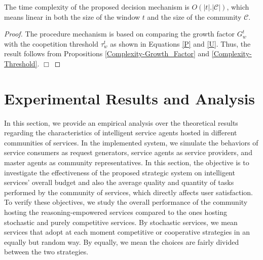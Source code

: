 \begin{theorem}\label{Complexity-Procedure}
The time complexity of the proposed decision mechanism is
$O(|t|.|\mathcal{C}|)$, which means linear in both the size of the
window $t$ and the size of the community $\mathcal{C}$.
\end{theorem}

\begin{proof}
The procedure mechanism is based on comparing the growth factor
$G_w^t$ with the coopetition threshold $\tau_w^t$ as shown in
Equations \ref{P} and \ref{U}. Thus, the result follows from
Propositions \ref{Complexity-Growth_Factor} and
\ref{Complexity-Threshold}. $\Box$
\end{proof}



\section{Experimental Results and Analysis}\label{s4:resutls}

In this section, we provide an empirical analysis over the
theoretical results regarding the characteristics of intelligent
service agents hosted in different communities of services. In the
implemented system, we simulate the behaviors of service consumers
as request generators, service agents as service providers, and
master agents as community representatives.
In this section, the objective is to
investigate the effectiveness of the proposed strategic system on
intelligent services' overall budget and also the average quality
and quantity of tasks performed by the community of services,
which directly affects user satisfaction.
To verify these objectives, we study the overall performance of
the community hosting the reasoning-empowered services compared to
the ones hosting stochastic and purely competitive services. By
stochastic services, we mean services that adopt at each moment
competitive or cooperative strategies in an equally but random
way. By equally, we mean the choices are fairly divided between
the two strategies.

